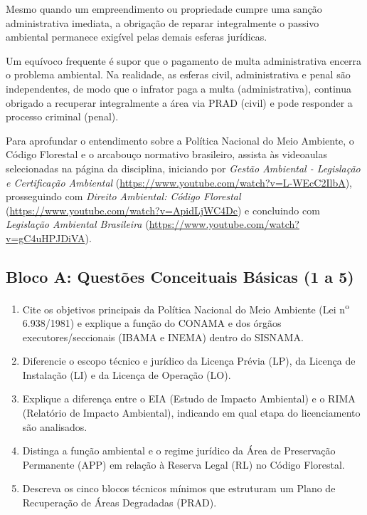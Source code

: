 Mesmo quando um empreendimento ou propriedade cumpre uma sanção administrativa imediata, a obrigação de reparar integralmente o passivo ambiental permanece exigível pelas demais esferas jurídicas.

\begin{boxErro}
Um equívoco frequente é supor que o pagamento de multa administrativa encerra o problema ambiental. Na realidade, as esferas civil, administrativa e penal são independentes, de modo que o infrator paga a multa (administrativa), continua obrigado a recuperar integralmente a área via PRAD (civil) e pode responder a processo criminal (penal).
\end{boxErro}

Para aprofundar o entendimento sobre a Política Nacional do Meio Ambiente, o Código Florestal e o arcabouço normativo brasileiro, assista às videoaulas selecionadas na página da disciplina, iniciando por \textit{Gestão Ambiental - Legislação e Certificação Ambiental} (\url{https://www.youtube.com/watch?v=L-WEcC2IlbA}), prosseguindo com \textit{Direito Ambiental: Código Florestal} (\url{https://www.youtube.com/watch?v=ApidLjWC4Dc}) e concluindo com \textit{Legislação Ambiental Brasileira} (\url{https://www.youtube.com/watch?v=gC4uHPJDiVA}).


\subsection*{Bloco A: Questões Conceituais Básicas (1 a 5)}
\begin{enumerate}[leftmargin=1.8em, itemsep=6pt]
  \item Cite os objetivos principais da Política Nacional do Meio Ambiente (Lei n\textsuperscript{o} 6.938/1981) e explique a função do CONAMA e dos órgãos executores/seccionais (IBAMA e INEMA) dentro do SISNAMA.
  \espacoResolucao[1.8cm]

  \item Diferencie o escopo técnico e jurídico da Licença Prévia (LP), da Licença de Instalação (LI) e da Licença de Operação (LO).
  \espacoResolucao[1.8cm]

  \item Explique a diferença entre o EIA (Estudo de Impacto Ambiental) e o RIMA (Relatório de Impacto Ambiental), indicando em qual etapa do licenciamento são analisados.
  \espacoResolucao[1.8cm]

  \item Distinga a função ambiental e o regime jurídico da Área de Preservação Permanente (APP) em relação à Reserva Legal (RL) no Código Florestal.
  \espacoResolucao[1.8cm]

  \item Descreva os cinco blocos técnicos mínimos que estruturam um Plano de Recuperação de Áreas Degradadas (PRAD).
  \espacoResolucao[1.8cm]
\end{enumerate}


